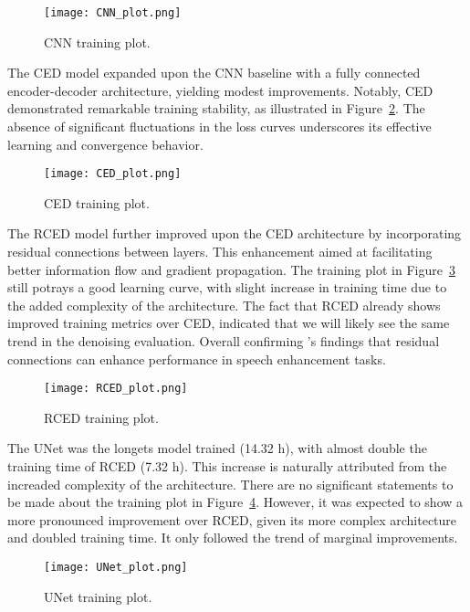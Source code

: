 \begin{figure}[H]
    \centering
    \texttt{[image: CNN\_plot.png]}
    \caption{\label{fig:cnn_training_plot} CNN training plot.}
\end{figure}

The CED model expanded upon the CNN baseline with a fully connected encoder-decoder architecture, yielding modest improvements. Notably, CED demonstrated remarkable training stability, as illustrated in Figure~\ref{fig:ced_training_plot}. The absence of significant fluctuations in the loss curves underscores its effective learning and convergence behavior.

\begin{figure}[H]
    \centering
    \texttt{[image: CED\_plot.png]}
    \caption{\label{fig:ced_training_plot} CED training plot.}
\end{figure}

The RCED model further improved upon the CED architecture by incorporating residual connections between layers. This enhancement aimed at facilitating better information flow and gradient propagation. The training plot in Figure~\ref{fig:rced_training_plot} still potrays a good learning curve, with slight increase in training time due to the added complexity of the architecture. The fact that RCED already shows improved training metrics over CED, indicated that we will likely see the same trend in the denoising evaluation. Overall confirming \cite{park2017acoustic}’s findings that residual connections can enhance performance in speech enhancement tasks.

\begin{figure}[H]
    \centering
    \texttt{[image: RCED\_plot.png]}
    \caption{\label{fig:rced_training_plot} RCED training plot.}
\end{figure}

The UNet was the longets model trained (14.32 h), with almost double the training time of RCED (7.32 h). This increase is naturally attributed from the increaded complexity of the architecture. There are no significant statements to be made about the training plot in Figure~\ref{fig:unet_training_plot}. However, it was expected to show a more pronounced improvement over RCED, given its more complex architecture and doubled training time. It only followed the trend of marginal improvements.

\begin{figure}[H]
    \centering
    \texttt{[image: UNet\_plot.png]}
    \caption{\label{fig:unet_training_plot} UNet training plot.}
\end{figure}

